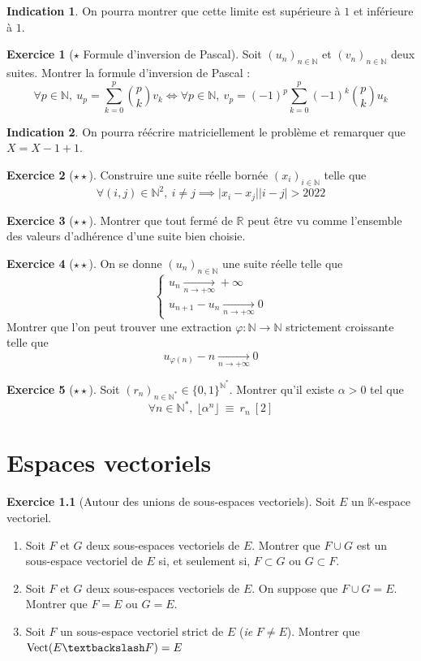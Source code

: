 \documentclass[french]{book}
\newcommand{\N}{\mathbb{N}}
\newcommand{\R}{\mathbb{R}}
\newcommand{\K}{\mathbb{K}}
\newcommand{\st}{^*}
\theoremstyle{definition}
\newtheorem{ex}{Exercice}[chapter]
\theoremstyle{theorem}
\newtheorem*{ind}{Indication}
\theoremstyle{remark}
\begin{document}
\begin{ind}
	On pourra montrer que cette limite est supérieure à $1$ et inférieure à $1$.
\end{ind}

\begin{ex}[$\star$ Formule d'inversion de Pascal]
	Soit $(u_n)_{n\in\N}$ et $(v_n)_{n\in\N}$ deux suites. Montrer la formule d'inversion de Pascal : $$\forall p\in\N,\ u_p=\sum_{k=0}^{p}\binom{p}{k}v_k \iff \forall p\in\N,\ v_p=(-1)^p\sum_{k=0}^{p}(-1)^k\binom{p}{k}u_k$$
	\begin{ind}
		On pourra réécrire matriciellement le problème et remarquer que $X=X-1+1$.
	\end{ind}
\end{ex}

\begin{ex}[$\star\star$]
	Construire une suite réelle bornée $(x_i)_{i\in\N}$ telle que $$\forall (i,j)\in\N^2,\ i\ne j\implies \lvert x_i-x_j\rvert\lvert i-j\rvert>2022$$
\end{ex}

\begin{ex}[$\star\star$]
	Montrer que tout fermé de $\R$ peut être vu comme l'ensemble des valeurs d'adhérence d'une suite bien choisie.
\end{ex}

\begin{ex}[$\star\star$]
	On se donne $(u_n)_{n\in\N}$ une suite réelle telle que $$\begin{cases}
		u_{n}\xrightarrow[n\to+\infty]{}+\infty\\
		u_{n+1}-u_{n}\xrightarrow[n\to+\infty]{}0
	\end{cases}$$ Montrer que l'on peut trouver une extraction $\varphi:\N\to\N$ strictement croissante telle que $$u_{\varphi(n)}-n\xrightarrow[n\to+\infty]{}0$$
\end{ex}

\begin{ex}[$\star\star$]
	Soit $(r_n)_{n\in\N\st}\in\{0,1\}^{\N\st}$. Montrer qu'il existe $\alpha>0$ tel que $$\forall n\in\N\st,\ \lfloor\alpha^n\rfloor\ \equiv\ r_n\ [2]$$
\end{ex}

\chapter{Espaces vectoriels}

\begin{ex}[Autour des unions de sous-espaces vectoriels]
	Soit $E$ un $\K$-espace vectoriel.
	\begin{enumerate}
		\item Soit $F$ et $G$ deux sous-espaces vectoriels de $E$. Montrer que $F\cup G$ est un sous-espace vectoriel de $E$ si, et seulement si, $F \subset G$ ou $G \subset F$.
		\item  Soit $F$ et $G$ deux sous-espaces vectoriels de $E$. On suppose que $F\cup G =E$. Montrer que $F=E$ ou $G=E$.
		\item Soit $F$ un sous-espace vectoriel strict de $E$ (\textit{ie} $F\ne E$). Montrer que $\text{Vect}(E\textbackslash F)=E$
	\end{enumerate}
\end{ex}
\end{document}
